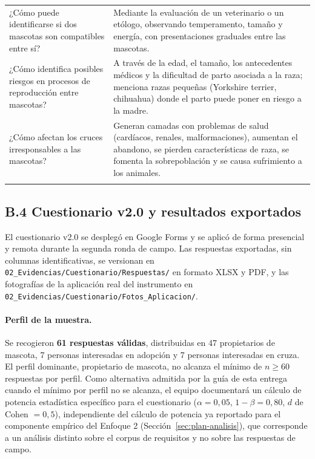 \documentclass[journal,onecolumn]{IEEEtran}
\begin{document}
{\begin{longtable}{@{}p{5.6cm} p{9.4cm}@{}}
			¿Cómo puede identificarse si dos mascotas son compatibles entre sí? & Mediante la evaluación de un veterinario o un etólogo, observando temperamento, tamaño y energía, con presentaciones graduales entre las mascotas. \\ \addlinespace
			
			¿Cómo identifica posibles riesgos en procesos de reproducción entre mascotas? & A través de la edad, el tamaño, los antecedentes médicos y la dificultad de parto asociada a la raza; menciona razas pequeñas (Yorkshire terrier, chihuahua) donde el parto puede poner en riesgo a la madre. \\ \addlinespace
			
			¿Cómo afectan los cruces irresponsables a las mascotas? & Generan camadas con problemas de salud (cardíacos, renales, malformaciones), aumentan el abandono, se pierden características de raza, se fomenta la sobrepoblación y se causa sufrimiento a los animales. \\ \addlinespace
			
		\end{longtable}
	}

	\subsection*{B.4 Cuestionario v2.0 y resultados exportados}
	
	El cuestionario v2.0 se desplegó en Google Forms y se aplicó de forma
	presencial y remota durante la segunda ronda de campo. Las respuestas
	exportadas, sin columnas identificativas, se versionan en
	\texttt{02\_Evidencias/Cuestionario/Respuestas/} en formato XLSX y PDF, y las
	fotografías de la aplicación real del instrumento en
	\texttt{02\_Evidencias/Cuestionario/Fotos\_Aplicacion/}.
	
	\paragraph{Perfil de la muestra.}
	Se recogieron \textbf{61 respuestas válidas}, distribuidas en 47 propietarios
	de mascota, 7 personas interesadas en adopción y 7 personas interesadas en
	cruza. El perfil dominante, propietario de mascota, no alcanza el mínimo
	de $n \geq 60$ respuestas por perfil. Como alternativa admitida por la
	guía de esta entrega cuando el mínimo por perfil no se alcanza, el equipo
	documentará un cálculo de potencia estadística específico para el
	cuestionario ($\alpha = 0{,}05$, $1 - \beta = 0{,}80$, $d$ de Cohen
	$= 0{,}5$), independiente del cálculo de potencia ya reportado para el
	componente empírico del Enfoque 2 (Sección~\ref{sec:plan-analisis}), que
	corresponde a un análisis distinto sobre el corpus de requisitos y no
	sobre las respuestas de campo.
	
\end{document}
